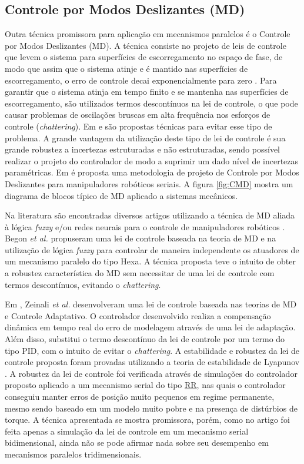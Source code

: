 \documentclass[]{politex}
\begin{document}
\subsection{Controle por Modos Deslizantes (MD)}

Outra técnica promissora para aplicação em mecanismos paralelos é o Controle por Modos Deslizantes (MD). A técnica consiste no projeto de leis de controle que levem o sistema para superfícies de escorregamento no espaço de fase, de modo que assim que o sistema atinje e é mantido nas superfícies de escorregamento, o erro de controle decai exponencialmente para zero \cite{Slotini}. Para garantir que o sistema atinja em tempo finito e se mantenha nas superfícies de escorregamento, são utilizados termos descontínuos na lei de controle, o que pode causar problemas de oscilações bruscas em alta frequência nos esforços de controle ({\em chattering}). Em \cite{Guldner}  e  \cite{Utkin2} são propostas técnicas para evitar esse tipo de problema. A grande vantagem da utilização deste tipo de lei de controle é sua grande robustez a incertezas estruturadas e não estruturadas, sendo possível realizar o projeto do controlador de modo a suprimir um dado nível de incertezas paramétricas. Em \cite{SlotiniSMC} é proposta uma metodologia de projeto de Controle por Modos Deslizantes para manipuladores robóticos seriais. A figura \ref{fig:CMD} mostra um diagrama de blocos típico de MD aplicado a sistemas mecânicos. 

Na literatura são encontradas diversos artigos utilizando a técnica de MD aliada à lógica {\em fuzzy} e/ou redes neurais para o controle de manipuladores robóticos \cite{Begon, Ertugrul, Hu, Sadati}. Begon \emph{et al.} \cite{Begon} propuseram uma lei de controle baseada na teoria de MD e na utilização de lógica {\em fuzzy} para controlar de maneira independente os atuadores de um mecanismo paralelo do tipo Hexa. A técnica proposta teve o intuito de obter a robustez característica do MD sem necessitar de uma lei de controle com termos descontínuos, evitando o {\em chattering}.

Em \cite{Zeinali}, Zeinali \emph{et al.} desenvolveram uma lei de controle  baseada nas teorias de MD e Controle Adaptativo. O controlador desenvolvido realiza a compensação dinâmica em tempo real do erro de modelagem através de uma lei de adaptação. Além disso, substitui o termo descontínuo da lei de controle por um termo do tipo PID, com o intuito de evitar o {\em chattering}. A estabilidade e robustez da lei de controle proposta foram provadas utilizando a teoria de estabilidade de Lyapunov \cite{Slotini}. A robustez da lei de controle foi verificada através de simulações do controlador proposto aplicado a um mecanismo serial do tipo \underline{R}\underline{R}, nas quais o controlador conseguiu manter erros de posição muito pequenos em regime permanente, mesmo sendo baseado em um modelo muito pobre e na presença de distúrbios de torque. A técnica apresentada se mostra promissora, porém, como no artigo foi feita apenas a simulação da lei de controle em um mecanismo serial bidimensional, ainda não se pode afirmar nada sobre seu desempenho em mecanismos paralelos tridimensionais.
\end{document}
